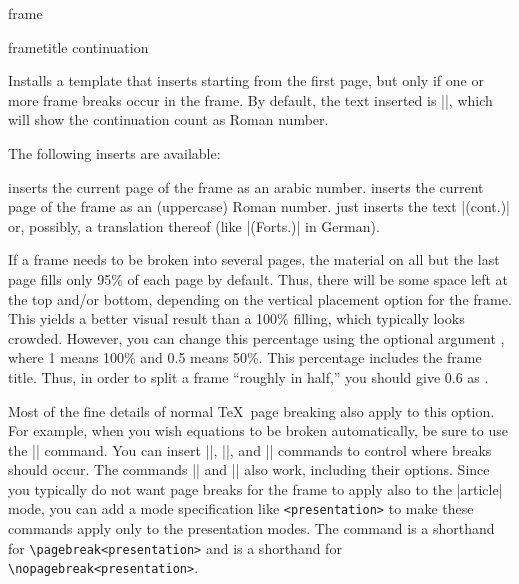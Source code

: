 \begin{environment}{{frame}}
\begin{frame}[<+->][plain]
\begin{frame}[plain]
\begin{itemize}
\begin{enumerate}
\begin{element}{frametitle continuation}
\begin{templateoptions}
          Installs a template that inserts  starting from the first page, but only if one or more frame breaks occur in the frame. By default, the text inserted is  |\insertcontinuationcountroman|,  which  will show the continuation count as Roman number.
        \end{templateoptions}
        The following inserts are available:
        \begin{templateinserts}
          \iteminsert{\insertcontinuationcount}
          inserts the current page of the frame as an arabic number.
          \iteminsert{\insertcontinuationcountroman}
          inserts the current page of the frame as an (uppercase) Roman number.
          \iteminsert{\insertcontinuationtext}
          just inserts the text |(cont.)| or, possibly, a translation thereof (like |(Forts.)| in German).
        \end{templateinserts}
      \end{element}
    \end{enumerate}

    If a frame needs to be broken into several pages, the material on all but the last page fills only 95\% of each page by default. Thus, there will be some space left at the top and/or bottom, depending on the vertical placement option for the frame. This yields a better visual result than a 100\% filling, which typically looks crowded. However, you can change this percentage using the optional argument , where 1 means 100\% and 0.5 means 50\%. This percentage includes the frame title. Thus, in order to split a frame ``roughly in half,'' you should give 0.6 as .

    Most of the fine details of normal \TeX\ page breaking also apply to this option. For example, when you wish equations to be broken automatically, be sure to use the |\allowdisplaybreaks| command. You can insert |\break|, |\nobreak|, and |\penalty| commands to control where breaks should occur. The commands |\pagebreak| and |\nopagebreak| also work, including their options. Since you typically do not want page breaks for the frame to apply also to the |article| mode, you can add a mode specification like \Verb|<presentation>| to make these commands apply only to the presentation modes. The command \declare{|\string\framebreak|} is a shorthand for \Verb|\pagebreak<presentation>| and \declare{|\string\noframebreak|} is a shorthand for \Verb|\nopagebreak<presentation>|.


\end{itemize}
\end{frame}
\end{frame}
\end{environment}
